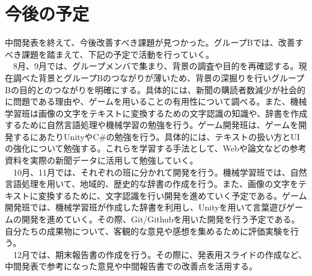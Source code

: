 \section{今後の予定}
中間発表を終えて、今後改善すべき課題が見つかった。グループBでは、改善すべき課題を踏まえて、下記の予定で活動を行っていく。\\
　8月、9月では、グループメンバで集まり、背景の調査や目的を再確認する。現在調べた背景とグループBのつながりが薄いため、背景の深掘りを行いグループBの目的とのつながりを明確にする。具体的には、新聞の購読者数減少が社会的に問題である理由や、ゲームを用いることの有用性について調べる。また、機械学習班は画像の文字をテキストに変換するための文字認識の知識や、辞書を作成するために自然言語処理や機械学習の勉強を行う。ゲーム開発班は、ゲームを開発するにあたりUnityやC\#の勉強を行う。具体的には、テキストの扱い方とUIの強化について勉強する。これらを学習する手法として、Webや論文などの参考資料を実際の新聞データに活用して勉強していく。\\
　10月、11月では、それぞれの班に分かれて開発を行う。機械学習班では、自然言語処理を用いて、地域的、歴史的な辞書の作成を行う。また、画像の文字をテキストに変換するために、文字認識を行い開発を進めていく予定である。ゲーム開発班では、機械学習班が作成した辞書を利用し、Unityを用いて言葉遊びゲームの開発を進めていく。その際、Git/Githubを用いた開発を行う予定である。自分たちの成果物について、客観的な意見や感想を集めるために評価実験を行う。\\
　12月では、期末報告書の作成を行う。その際に、発表用スライドの作成など、中間発表で参考になった意見や中間報告書での改善点を活用する。
